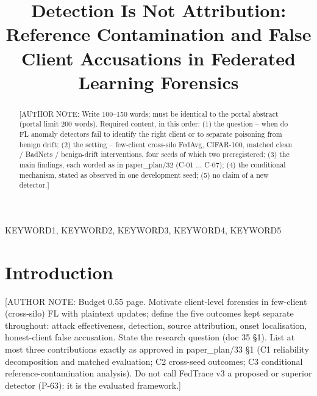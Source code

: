 \documentclass{article}
\title{Detection Is Not Attribution: Reference Contamination and False Client Accusations in Federated Learning Forensics}
\newif\ifshownotes \shownotestrue
\newcommand{\authornote}[1]{\ifshownotes{\color{blue}\footnotesize[AUTHOR NOTE: #1]}\fi}
\begin{document}
\ninept
\maketitle

\begin{abstract}
\authornote{Write 100--150 words; must be identical to the portal abstract (portal limit 200 words). Required
content, in this order: (1) the question -- when do FL anomaly detectors fail to identify the right client or to
separate poisoning from benign drift; (2) the setting -- few-client cross-silo FedAvg, CIFAR-100, matched clean /
BadNets / benign-drift interventions, four seeds of which two preregistered; (3) the main findings, each worded as in
paper\_plan/32 (C-01 ... C-07); (4) the conditional mechanism, stated as observed in one development seed; (5) no
claim of a new detector.}
\end{abstract}

\begin{keywords}
KEYWORD1, KEYWORD2, KEYWORD3, KEYWORD4, KEYWORD5
\end{keywords}

\section{Introduction}
\label{sec:intro}
\authornote{Budget 0.55 page. Motivate client-level forensics in few-client (cross-silo) FL with plaintext updates;
define the five outcomes kept separate throughout: attack effectiveness, detection, source attribution,
onset localisation, honest-client false accusation. State the research question (doc 35 \S1). List at most three
contributions exactly as approved in paper\_plan/33 \S1 (C1 reliability decomposition and matched evaluation;
C2 cross-seed outcomes; C3 conditional reference-contamination analysis). Do not call FedTrace v3 a proposed or
superior detector (P-63): it is the evaluated framework.}

\end{document}
